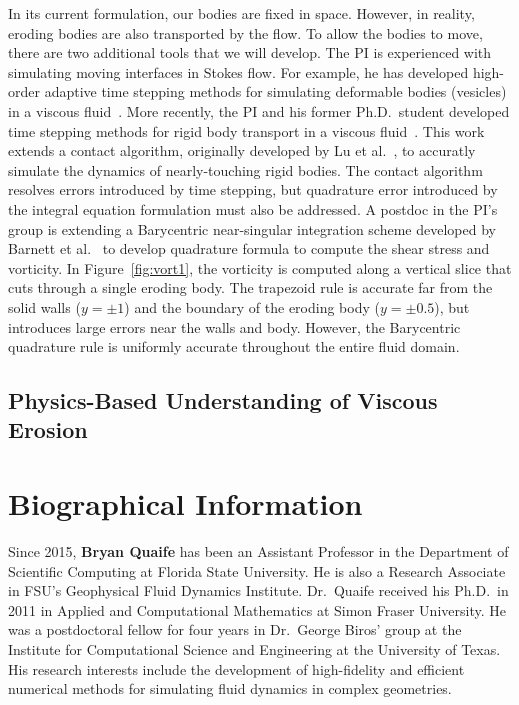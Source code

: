 \documentclass[11pt]{article}
\begin{document}
In its current formulation, our bodies are fixed in space.  However, in
reality, eroding bodies are also transported by the flow.  To allow the
bodies to move, there are two additional tools that we will develop.
The PI is experienced with simulating moving interfaces in Stokes flow.
For example, he has developed high-order adaptive time stepping methods
for simulating deformable bodies (vesicles) in a viscous
fluid~\cite{qua-bir2015b, qua-bir2014, qua-bir2016}. More recently, the
PI and his former Ph.D.~student developed time stepping methods for
rigid body transport in a viscous fluid~\cite{bys-sha-qua2018}.  This
work extends a contact algorithm, originally developed by Lu et
al.~\cite{lu-rah-zor2017}, to accuratly simulate the dynamics of
nearly-touching rigid bodies.  The contact algorithm resolves errors
introduced by time stepping, but quadrature error introduced by the
integral equation formulation must also be addressed.  A postdoc in the
PI's group is extending a Barycentric near-singular integration scheme
developed by Barnett et al.~\cite{bar-wu-vee2015} to develop quadrature
formula to compute the shear stress and vorticity.  In
Figure~\ref{fig:vort1}, the vorticity is computed along a vertical slice
that cuts through a single eroding body.  The trapezoid rule is accurate
far from the solid walls ($y = \pm 1$) and the boundary of the eroding
body ($y = \pm 0.5$), but introduces large errors near the walls and
body.  However, the Barycentric quadrature rule is uniformly accurate
throughout the entire fluid domain.


\subsection{Physics-Based Understanding of Viscous Erosion}

\section{Biographical Information}
Since 2015, {\bf Bryan Quaife} has been an Assistant Professor in the
Department of Scientific Computing at Florida State University.  He is
also a Research Associate in FSU's Geophysical Fluid Dynamics Institute.
Dr.~Quaife received his Ph.D.~in 2011 in Applied and Computational
Mathematics at Simon Fraser University.  He was a postdoctoral fellow
for four years in Dr.~George Biros' group at the Institute for
Computational Science and Engineering at the University of Texas.  His
research interests include the development of  high-fidelity and
efficient numerical methods for simulating fluid dynamics in complex
geometries.
\end{document}
